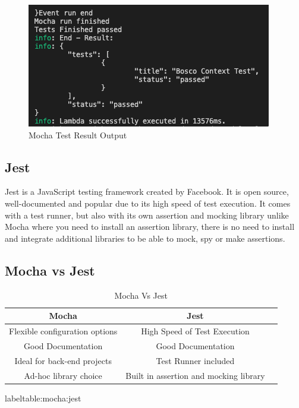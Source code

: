 \documentclass[12pt,a4paper,titlepage]{report}
\begin{document}
\begin{figure}[ht]
 \centering
 \includegraphics[width=\textwidth,height=\textheight,keepaspectratio]{./diagrams/mocha_test_result.png}
 \caption{Mocha Test Result Output}
\end{figure}

\subsection{Jest}

Jest is a JavaScript testing framework created by Facebook. It is open source, well-documented and popular due to its
high speed of test execution. It comes with a test runner, but also with its own assertion and mocking library unlike Mocha where you need to install an assertion
library, there is no need to install and integrate additional libraries to be able to mock, spy or make assertions.

\subsection{Mocha vs Jest}

\begin{table}[ht]
 \centering
 \small
 \setlength\tabcolsep{6pt}
 \begin{tabular}{|c|c|c}
  \hline \textbf
  {Mocha}       & \textbf {Jest}\\
  \hline\hline
  Flexible configuration options & High Speed of Test Execution\\
  \hline
  Good Documentation       & Good Documentation\\
  \hline
  Ideal for back-end projects  & Test Runner included\\
  \hline
  Ad-hoc library choice     & Built in assertion and mocking library\\
  \hline
 \end{tabular}
 \caption{Mocha Vs Jest}
label{table:mocha:jest}
\end{table}
\end{document}
